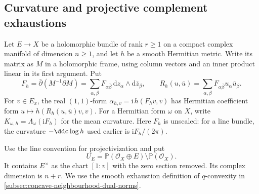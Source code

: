 \subsection{Curvature and projective complement exhaustions}
\label{subsec:projective-complement-curvature-index}

Let $E\to X$ be a holomorphic bundle of rank $r\geq1$ on a compact complex manifold of dimension $n\geq1$, and let $h$ be a smooth Hermitian metric. Write its matrix as $M$ in a holomorphic frame, using column vectors and an inner product linear in its first argument. Put
\[
 F_h=\bar\partial(M^{-1}\partial M)
     =\sum_{\alpha,\beta}F_{\alpha\bar\beta}\,\mathrm dz_\alpha\wedge\mathrm d\bar z_\beta,
 \qquad R_h(u,\bar u)=\sum_{\alpha,\beta}F_{\alpha\bar\beta}u_\alpha\bar u_\beta.
\]
For $v\in E_x$, the real $(1,1)$-form $\alpha_{h,v}=\mathrm i\,h(F_hv,v)$ has Hermitian coefficient form $u\mapsto h(R_h(u,\bar u)v,v)$. For a Hermitian form $\omega$ on $X$, write $K_{\omega,h}=\Lambda_\omega(\mathrm iF_h)$ for the mean curvature. Here $F_h$ is unscaled: for a line bundle, the curvature $-\ddc\log h$ used earlier is $\mathrm iF_h/(2\pi)$.

Use the line convention for projectivization and put
\[
 U_E=\mathbb P(\mathcal O_X\oplus E)\setminus\mathbb P(\mathcal O_X).
\]
It contains $E^\times$ as the chart $[1:v]$ with the zero section removed. Its complex dimension is $n+r$. We use the smooth exhaustion definition of $q$-convexity in \cref{subsec:concave-neighbourhood-dual-norms}.


